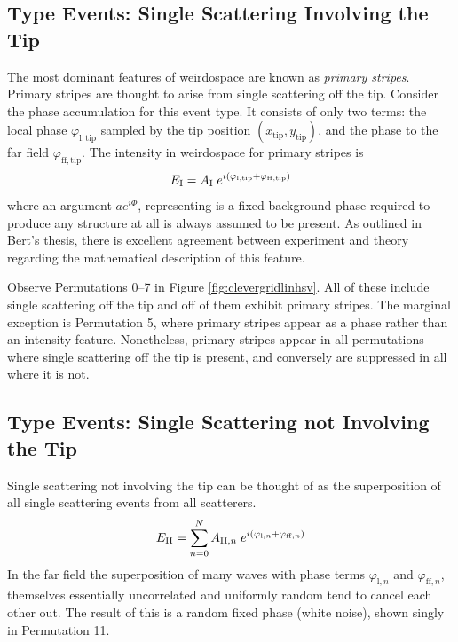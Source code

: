 \subsection{Type  Events: Single Scattering Involving the Tip}
The most dominant features of weirdospace are known as {\it primary
stripes}.  Primary stripes are thought to arise from single scattering off
the tip.  Consider the phase accumulation for this event type.  It consists
of only two terms: the local phase $\varphi_\mathrm{l,tip}$ sampled by the tip
position $(x_\mathrm{tip},y_\mathrm{tip})$, and the phase to the far field
$\varphi_\mathrm{ff,tip}$.  The intensity in weirdospace for primary stripes is
\begin{align}
E_\mathrm{\Rmnum{1}}=
A_\mathrm{\Rmnum{1}}\;
e^{i(\varphi_\mathrm{l,tip}+\varphi_\mathrm{ff,tip})}
\end{align}
where an argument $a e^{i \Phi}$, representing is a fixed background phase required to
produce any structure at all is always assumed to be present.  As outlined in Bert's thesis, there is
excellent agreement between experiment and theory regarding the
mathematical description of this feature.

Observe Permutations \numrange{0}{7} in Figure \ref{fig:clevergridlinhsv}.  All of these include single
scattering off the tip and off of them exhibit primary stripes.  The
marginal exception is Permutation \num{5}, where primary stripes appear as
a phase rather than an intensity feature.  Nonetheless, primary stripes
appear in all permutations where single scattering off the tip is present, and
conversely are suppressed in all where it is not.

\subsection{Type  Events: Single Scattering not Involving the Tip}
Single scattering not involving the tip can be thought of as the
superposition of all single scattering events from all scatterers.
\begin{align}
E_\mathrm{\Rmnum{2}}=
\sum_{n=0}^{N}
A_{\mathrm{\Rmnum{2}},n}\;
e^{i(\varphi_{\mathrm{l},n}+\varphi_{\mathrm{ff},n})}
\end{align}
In the far field the superposition of many waves with phase terms
$\varphi_{\mathrm{l},n}$ and $\varphi_{\mathrm{ff},n}$, themselves
essentially uncorrelated and uniformly random tend to cancel each other out.
The result of this is a random fixed phase (white noise), shown singly in
Permutation \num{11}.

